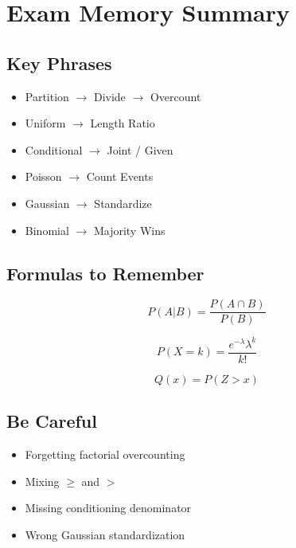 \documentclass[11pt]{article}
\begin{document}
\section*{Exam Memory Summary}

\subsection*{Key Phrases}
\begin{itemize}
    \item Partition $\rightarrow$ Divide $\rightarrow$ Overcount
    \item Uniform $\rightarrow$ Length Ratio
    \item Conditional $\rightarrow$ Joint / Given
    \item Poisson $\rightarrow$ Count Events
    \item Gaussian $\rightarrow$ Standardize
    \item Binomial $\rightarrow$ Majority Wins
\end{itemize}

\subsection*{Formulas to Remember}
\[
P(A|B)=\frac{P(A\cap B)}{P(B)}
\]

\[
P(X=k)=\frac{e^{-\lambda}\lambda^k}{k!}
\]

\[
Q(x)=P(Z>x)
\]

\subsection*{Be Careful}
\begin{itemize}
    \item Forgetting factorial overcounting
    \item Mixing $\ge$ and $>$
    \item Missing conditioning denominator
    \item Wrong Gaussian standardization
\end{itemize}
\end{document}
